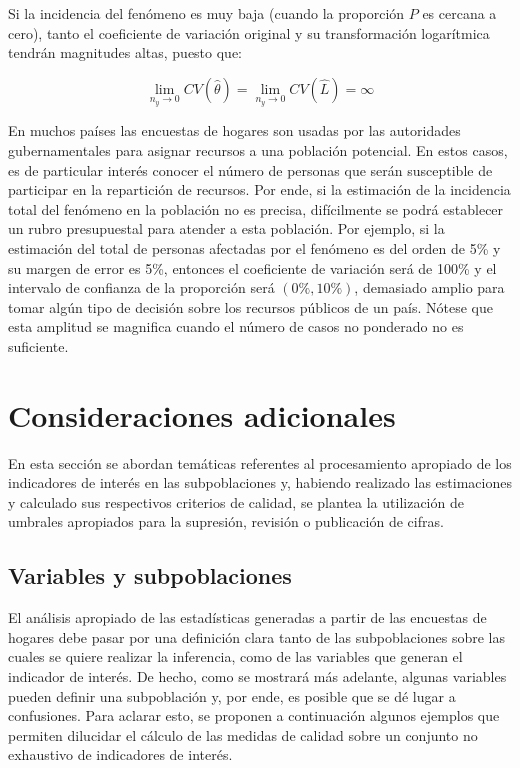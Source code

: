 \documentclass[12pt,spanish,]{book}
\begin{document}
Si la incidencia del fenómeno es muy baja (cuando la proporción \(P\) es cercana a cero), tanto el coeficiente de variación original y su transformación logarítmica tendrán magnitudes altas, puesto que:

\[
\lim_{n_y \rightarrow 0} CV(\hat \theta) = 
\lim_{n_y \rightarrow 0} CV(\hat L) = \infty
\]

En muchos países las encuestas de hogares son usadas por las autoridades gubernamentales para asignar recursos a una población potencial. En estos casos, es de particular interés conocer el número de personas que serán susceptible de participar en la repartición de recursos. Por ende, si la estimación de la incidencia total del fenómeno en la población no es precisa, difícilmente se podrá establecer un rubro presupuestal para atender a esta población. Por ejemplo, si la estimación del total de personas afectadas por el fenómeno es del orden de 5\% y su margen de error es 5\%, entonces el coeficiente de variación será de 100\% y el intervalo de confianza de la proporción será \((0 \%, 10 \%)\), demasiado amplio para tomar algún tipo de decisión sobre los recursos públicos de un país. Nótese que esta amplitud se magnifica cuando el número de casos no ponderado no es suficiente.

\hypertarget{consideraciones-adicionales}{%
\section{Consideraciones adicionales}\label{consideraciones-adicionales}}

En esta sección se abordan temáticas referentes al procesamiento apropiado de los indicadores de interés en las subpoblaciones y, habiendo realizado las estimaciones y calculado sus respectivos criterios de calidad, se plantea la utilización de umbrales apropiados para la supresión, revisión o publicación de cifras.

\hypertarget{variables-y-subpoblaciones}{%
\subsection{Variables y subpoblaciones}\label{variables-y-subpoblaciones}}

El análisis apropiado de las estadísticas generadas a partir de las encuestas de hogares debe pasar por una definición clara tanto de las subpoblaciones sobre las cuales se quiere realizar la inferencia, como de las variables que generan el indicador de interés. De hecho, como se mostrará más adelante, algunas variables pueden definir una subpoblación y, por ende, es posible que se dé lugar a confusiones. Para aclarar esto, se proponen a continuación algunos ejemplos que permiten dilucidar el cálculo de las medidas de calidad sobre un conjunto no exhaustivo de indicadores de interés.
\end{document}
